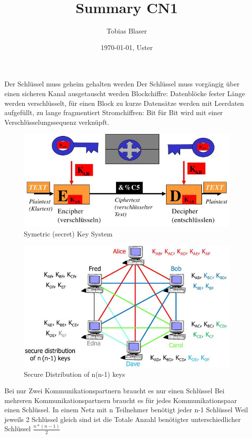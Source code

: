 \documentclass[ngerman,a4paper,12pt]{scrreprt}
\title{Summary CN1}
\author{Tobias Blaser}
\date{\today{}, Uster}
\begin{document}
\tableofcontents
\clearpage


\ul
	\li Der Schlüssel muss geheim gehalten werden 
	\li Der Schlüssel muss vorgängig über einen sicheren Kanal ausgetauscht werden
	\li Blockchiffre: Datenblöcke fester Länge werden verschlüsselt, für einen Block zu kurze Datensätze werden mit Leerdaten aufgefüllt, zu lange fragmentiert
	\li Stromchiffren: Bit für Bit wird mit einer Verschlüsselungssequenz verknüpft.
\ulE
\begin{figure}[H]
	\centering
	\includegraphics[width=\textwidth]{img/V5.1.jpg}
	\caption{Symetric (secret) Key System}
	\label{}
\end{figure}

\begin{figure}[H]
	\centering
	\includegraphics[width=\textwidth]{img/V5.2.jpg}
	\caption{Secure Distribution of n(n-1) keys}
	\label{}
\end{figure}
\ul
	\li Bei nur Zwei Kommunikationspartnern braucht es nur einen Schlüssel
	\li Bei mehreren Kommunikationspartnern braucht es für jedes Kommunikationspaar einen Schlüssel.
	\li In einem Netz mit n Teilnehmer benötigt jeder n-1 Schlüssel
	\li Weil jeweils 2 Schlüssel gleich sind ist die Totale Anzahl benötigter unterschiedlicher Schlüssel $\frac{n*(n-1)}{2}$
\ulE
\end{document}
